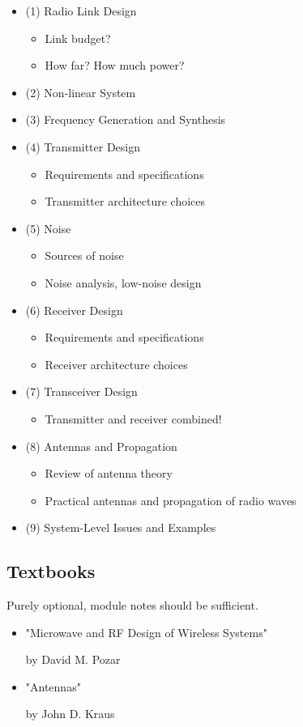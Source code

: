 \documentclass[12pt]{article}
\begin{document}
\begin{itemize}[noitemsep]
    \item (1) Radio Link Design
    \begin{itemize}[noitemsep]
        \item Link budget?
        \item How far? How much power?
    \end{itemize}
    \item (2) Non-linear System
    \item (3) Frequency Generation and Synthesis
    \item (4) Transmitter Design
    \begin{itemize}[noitemsep]
        \item Requirements and specifications
        \item Transmitter architecture choices
    \end{itemize}
    \item (5) Noise
    \begin{itemize}[noitemsep]
        \item Sources of noise
        \item Noise analysis, low-noise design
    \end{itemize}
    \item (6) Receiver Design
    \begin{itemize}[noitemsep]
        \item Requirements and specifications
        \item Receiver architecture choices
    \end{itemize}
    \item (7) Transceiver Design
    \begin{itemize}[noitemsep]
        \item Transmitter and receiver combined!
    \end{itemize}
    \item (8) Antennas and Propagation
    \begin{itemize}[noitemsep]
        \item Review of antenna theory
        \item Practical antennas and propagation of radio waves
    \end{itemize}
    \item (9) System-Level Issues and Examples
\end{itemize}

\subsection{Textbooks}
Purely optional, module notes should be sufficient.

\begin{itemize}[noitemsep]
    \item "Microwave and RF Design of Wireless Systems"

    by David M. Pozar
    \item "Antennas"

    by John D. Kraus
\end{itemize}
\end{document}
